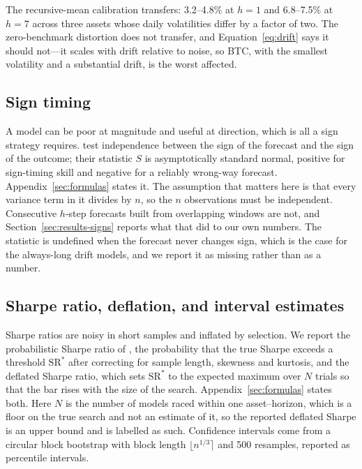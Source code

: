 \documentclass{article}
\theoremstyle{plain}
\theoremstyle{definition}
\begin{document}
The recursive-mean calibration transfers: 3.2--4.8\% at $h=1$ and 6.8--7.5\% at $h=7$ across
three assets whose daily volatilities differ by a factor of two. The zero-benchmark distortion
does not transfer, and Equation~\eqref{eq:drift} says it should not---it scales with drift
relative to noise, so BTC, with the smallest volatility and a substantial drift, is the worst
affected.

\subsection{Sign timing}
\label{sec:sign}

A model can be poor at magnitude and useful at direction, which is all a sign
strategy requires. \citet{pesaran1992} test independence between the sign of the
forecast and the sign of the outcome; their statistic $S$ is asymptotically
standard normal, positive for sign-timing skill and negative for a reliably
wrong-way forecast. Appendix~\ref{sec:formulas} states it. The assumption that
matters here is that every variance term in it divides by $n$, so the $n$
observations must be independent. Consecutive $h$-step forecasts built from
overlapping windows are not, and Section~\ref{sec:results-signs} reports what that
did to our own numbers. The statistic is undefined when the forecast never changes
sign, which is the case for the always-long drift models, and we report it as
missing rather than as a number.

\subsection{Sharpe ratio, deflation, and interval estimates}

Sharpe ratios are noisy in short samples \citep{lo2002} and inflated by selection.
We report the probabilistic Sharpe ratio of \citet{bailey2014}, the probability
that the true Sharpe exceeds a threshold $\mathrm{SR}^{\ast}$ after correcting for
sample length, skewness and kurtosis, and the deflated Sharpe ratio, which sets
$\mathrm{SR}^{\ast}$ to the expected maximum over $N$ trials so that the bar rises
with the size of the search. Appendix~\ref{sec:formulas} states both. Here $N$ is
the number of models raced within one asset--horizon, which is a floor on the true
search and not an estimate of it, so the reported deflated Sharpe is an upper bound
and is labelled as such. Confidence intervals come from a circular block bootstrap
\citep{politis1994} with block length $\lfloor n^{1/3} \rceil$ and 500 resamples,
reported as percentile intervals.
\end{document}
